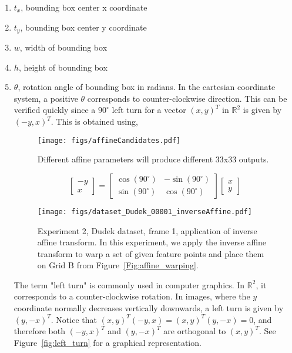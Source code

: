 \begin{enumerate}
\item $t_x$, bounding box center x coordinate
\item $t_y$, bounding box center y coordinate
\item $w$, width of bounding box
\item $h$, height of bounding box
\item $\theta$, rotation angle of bounding box in radians.  In the cartesian coordinate system, a positive $\theta$ corresponds to counter-clockwise direction.  This can be verified quickly since a $90^{\circ}$ left turn for a vector $(x,y)^T$ in $\mathbb{R}^2$ is given by $(-y,x)^T$.  This is obtained using,

								\begin{figure}[t]
								\centering
								\texttt{[image: figs/affineCandidates.pdf]}
								\caption{Different affine parameters will produce different 33x33 outputs.}
								\label{Fig:affine_candidates}
								\end{figure}
\begin{equation}
\left[\begin{array}{ccc}
-y 
\\ 
x
\end{array}
\right]=
\left[
\begin{array}{rrr}
\cos(90^{\circ}) & -\sin(90^{\circ}) \\
\sin(90^{\circ}) & \cos(90^{\circ})
\end{array}
\right]
\left[\begin{array}{ccc}
x 
\\ 
y
\end{array}
\right]
\end{equation}

								\begin{figure}[t]
								\centering
								\texttt{[image: figs/dataset\_Dudek\_00001\_inverseAffine.pdf]}
								\caption{Experiment 2, Dudek dataset, frame 1, application of inverse affine transform.  In this experiment, we apply the inverse affine transform to warp a set of given feature points and place them on Grid B from Figure~\ref{Fig:affine_warping}.}
								\label{fig:original_feature_points}
								\end{figure}


The term "left turn" is commonly used in computer graphics.  In  $\mathbb{R}^2$, it corresponds to a counter-clockwise rotation.  In images, where the $y$ coordinate normally decreases vertically downwards, a left turn is given by $(y,-x)^T$.  Notice that $(x,y)^T(-y,x) = (x,y)^T(y,-x) = 0$, and therefore both $ (-y,x)^T$ and $(y,-x)^T$ are orthogonal to $(x,y)^T$.  See Figure~\ref{fig:left_turn} for a graphical representation.
\end{enumerate}

